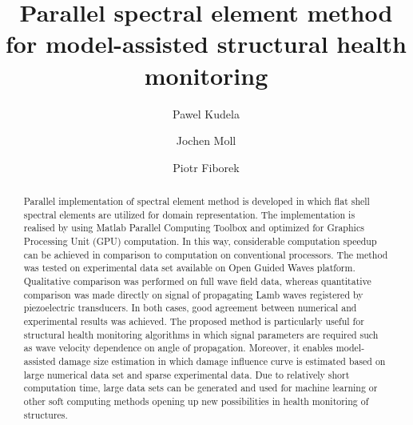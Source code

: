 \documentclass[preprint,12pt]{elsarticle}
\begin{document}
	\begin{frontmatter}
		
		\title{Parallel spectral element method for model-assisted structural health monitoring}
		
		\address[IFFM]{Institute of Fluid Flow Machinery, Polish Academy of Sciences, Poland}
		\address[GU]{Goethe University, Germany}
		
		
		\author{Pawel Kudela}
		\author{Jochen Moll}
		\author{Piotr Fiborek }
		
		
		\begin{abstract}
			Parallel implementation of spectral element method is developed in which flat shell spectral elements are utilized for domain representation. The implementation is realised by using Matlab Parallel Computing Toolbox and optimized for Graphics Processing Unit (GPU) computation. In this way, considerable computation speedup can be achieved in comparison to computation on conventional processors. The method was tested on experimental data set available on Open Guided Waves platform. Qualitative comparison was performed on full wave field data, whereas quantitative comparison was made directly on signal of propagating Lamb waves registered by piezoelectric transducers. In both cases, good agreement between numerical and experimental results was achieved. The proposed method is particularly useful for structural health monitoring algorithms in which signal parameters are required such as wave velocity dependence on angle of propagation. Moreover, it enables model-assisted damage size estimation in which damage influence curve is estimated based on large numerical data set and sparse experimental data. Due to relatively short computation time, large data sets can be generated and used for machine learning or other soft computing methods opening up new possibilities in health monitoring of structures.
		\end{abstract}
		

\end{frontmatter}
\end{document}
